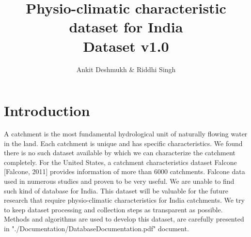 \documentclass[a4paper, 12pt]{article}
\author{Ankit Deshmukh \& Riddhi Singh}
\title{Physio-climatic characteristic dataset for India\\
  \large Dataset v1.0}
\begin{document}
\maketitle \clearpage
\tableofcontents \clearpage
\listoffigures \clearpage
\listoftables \clearpage
\lstlistoflistings \clearpage

\section{Introduction}\label{sec:Intro} %
A catchment is the most fundamental hydrological unit of naturally flowing water in the land. Each catchment is unique and has specific characteristics. We found there is no such dataset available by which we can characterize the catchment completely. For the United States, a catchment characteristics dataset Falcone [Falcone, 2011] provides information of more than 6000 catchments. Falcone data used in numerous studies and proven to be very useful. We are unable to find such kind of database for India. This dataset will be valuable for the future research that require physio-climatic characteristics for India catchments. We try to keep dataset processing and collection steps as transparent as possible. Methods and algorithms are used to develop this dataset, are carefully presented in "./Documentation/DatabaseDocumentation.pdf" document.
\end{document}
